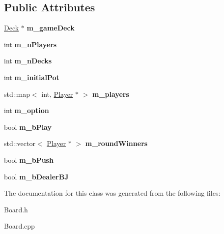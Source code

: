\subsection*{Public Attributes}
\begin{DoxyCompactItemize}
\item 
\hyperlink{class_deck}{Deck} $\ast$ {\bfseries m\+\_\+game\+Deck}\hypertarget{class_board_ada80a0972dfb2b375ad2eb511fd279a8}{}\label{class_board_ada80a0972dfb2b375ad2eb511fd279a8}

\item 
int {\bfseries m\+\_\+n\+Players}\hypertarget{class_board_a97a72d923bd0e2700f4b14a7310f9654}{}\label{class_board_a97a72d923bd0e2700f4b14a7310f9654}

\item 
int {\bfseries m\+\_\+n\+Decks}\hypertarget{class_board_a5e1be4593464a9cce5686f1e270336b3}{}\label{class_board_a5e1be4593464a9cce5686f1e270336b3}

\item 
int {\bfseries m\+\_\+initial\+Pot}\hypertarget{class_board_a58d873cc5cd6f53b864d78dc24fa79b6}{}\label{class_board_a58d873cc5cd6f53b864d78dc24fa79b6}

\item 
std\+::map$<$ int, \hyperlink{class_player}{Player} $\ast$ $>$ {\bfseries m\+\_\+players}\hypertarget{class_board_a1f6a9b7c28344b393ec4e262a7869259}{}\label{class_board_a1f6a9b7c28344b393ec4e262a7869259}

\item 
int {\bfseries m\+\_\+option}\hypertarget{class_board_a49016c4ad23c494dcae6147aa9d6f975}{}\label{class_board_a49016c4ad23c494dcae6147aa9d6f975}

\item 
bool {\bfseries m\+\_\+b\+Play}\hypertarget{class_board_a01c952bc01bdf1f11ca4564ba74eb54d}{}\label{class_board_a01c952bc01bdf1f11ca4564ba74eb54d}

\item 
std\+::vector$<$ \hyperlink{class_player}{Player} $\ast$ $>$ {\bfseries m\+\_\+round\+Winners}\hypertarget{class_board_a7efb156cd4173c8d20511140f0428be7}{}\label{class_board_a7efb156cd4173c8d20511140f0428be7}

\item 
bool {\bfseries m\+\_\+b\+Push}\hypertarget{class_board_ae04975c508016ffd956a0b777f875625}{}\label{class_board_ae04975c508016ffd956a0b777f875625}

\item 
bool {\bfseries m\+\_\+b\+Dealer\+BJ}\hypertarget{class_board_a62f8285f2e20e1d69ea373af8a950892}{}\label{class_board_a62f8285f2e20e1d69ea373af8a950892}

\end{DoxyCompactItemize}


The documentation for this class was generated from the following files\+:\begin{DoxyCompactItemize}
\item 
Board.\+h\item 
Board.\+cpp\end{DoxyCompactItemize}
